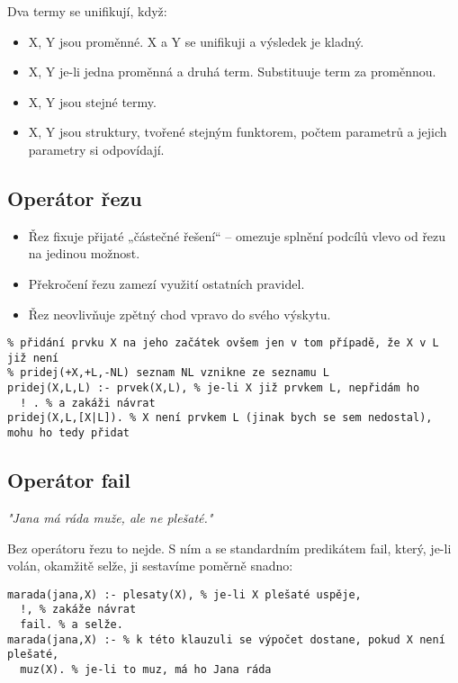 \documentclass{szzclass}
\begin{document}
Dva termy se unifikují, když:
\begin{itemize}
\item X, Y jsou proměnné. X a Y se unifikuji a výsledek je kladný.
\item X, Y je-li jedna proměnná a druhá term. Substituuje term za proměnnou.
\item X, Y jsou stejné termy.
\item X, Y jsou struktury, tvořené stejným funktorem, počtem parametrů a jejich parametry si odpovídají.
\end{itemize}

\subsection{Operátor řezu}
\begin{itemize}
\item Řez fixuje přijaté „částečné řešení“ – omezuje splnění podcílů vlevo od řezu na jedinou možnost.
\item Překročení řezu zamezí využití ostatních pravidel.
\item Řez neovlivňuje zpětný chod vpravo do svého výskytu.
\end{itemize}

\begin{verbatim}
% přidání prvku X na jeho začátek ovšem jen v tom případě, že X v L již není
% pridej(+X,+L,-NL) seznam NL vznikne ze seznamu L
pridej(X,L,L) :- prvek(X,L), % je-li X již prvkem L, nepřidám ho
  ! . % a zakáži návrat
pridej(X,L,[X|L]). % X není prvkem L (jinak bych se sem nedostal), mohu ho tedy přidat
\end{verbatim}

\subsection{Operátor fail}
\emph{"Jana má ráda muže, ale ne plešaté."}

Bez operátoru řezu to nejde. S ním a se standardním predikátem fail, který, je-li volán, okamžitě selže, ji sestavíme poměrně snadno:

\begin{verbatim}
marada(jana,X) :- plesaty(X), % je-li X plešaté uspěje,
  !, % zakáže návrat
  fail. % a selže.
marada(jana,X) :- % k této klauzuli se výpočet dostane, pokud X není plešaté,
  muz(X). % je-li to muz, má ho Jana ráda
\end{verbatim}
\end{document}
